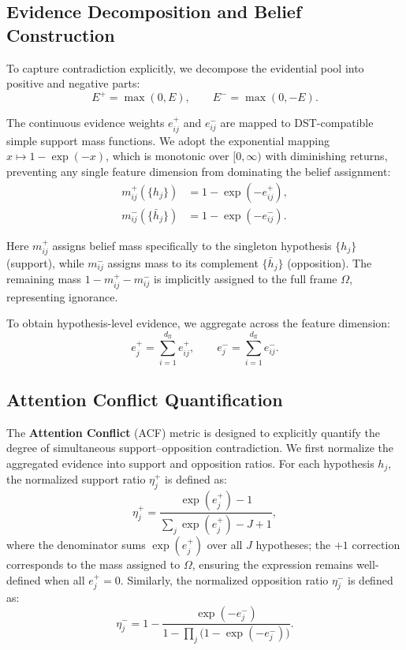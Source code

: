 \documentclass[preprint,12pt]{elsarticle}
\begin{document}
\subsection{Evidence Decomposition and Belief Construction}

To capture contradiction explicitly, we decompose the evidential pool into positive and negative parts:
\begin{equation}
E^+ = \max(0, E), \qquad E^- = \max(0, -E).
\end{equation}

The continuous evidence weights $e^+_{ij}$ and $e^-_{ij}$ are mapped to DST-compatible simple support mass functions. We adopt the exponential mapping $x \mapsto 1 - \exp(-x)$, which is monotonic over $[0, \infty)$ with diminishing returns, preventing any single feature dimension from dominating the belief assignment:
\begin{align}
m^+_{ij}(\{h_j\}) &= 1 - \exp(-e^+_{ij}), \label{eq:mass_pos} \\[4pt]
m^-_{ij}(\{\bar{h}_j\}) &= 1 - \exp(-e^-_{ij}). \label{eq:mass_neg}
\end{align}

Here $m^+_{ij}$ assigns belief mass specifically to the singleton hypothesis $\{h_j\}$ (support), while $m^-_{ij}$ assigns mass to its complement $\{\bar{h}_j\}$ (opposition). The remaining mass $1 - m^+_{ij} - m^-_{ij}$ is implicitly assigned to the full frame $\Omega$, representing ignorance.

To obtain hypothesis-level evidence, we aggregate across the feature dimension:
\begin{equation}
e^+_j = \sum_{i=1}^{d_{\text{ff}}} e^+_{ij}, \qquad e^-_j = \sum_{i=1}^{d_{\text{ff}}} e^-_{ij}.
\label{eq:macro_evidence}
\end{equation}

\subsection{Attention Conflict Quantification}
\label{sec:acf_method}

The \textbf{Attention Conflict} (ACF) metric is designed to explicitly quantify the degree of simultaneous support--opposition contradiction. We first normalize the aggregated evidence into support and opposition ratios. For each hypothesis $h_j$, the normalized support ratio $\eta^+_j$ is defined as:
\begin{equation}
\eta^+_j = \frac{\exp(e^+_j) - 1}{\sum_{j} \exp(e^+_j) - J + 1},
\label{eq:eta_plus}
\end{equation}
where the denominator sums $\exp(e^+_j)$ over all $J$ hypotheses; the $+1$ correction corresponds to the mass assigned to $\Omega$, ensuring the expression remains well-defined when all $e^+_j = 0$. Similarly, the normalized opposition ratio $\eta^-_j$ is defined as:
\begin{equation}
\eta^-_j = 1 - \frac{\exp(-e^-_j)}{1 - \prod_{j} \bigl(1 - \exp(-e^-_j)\bigr)}.
\label{eq:eta_minus}
\end{equation}
\end{document}
